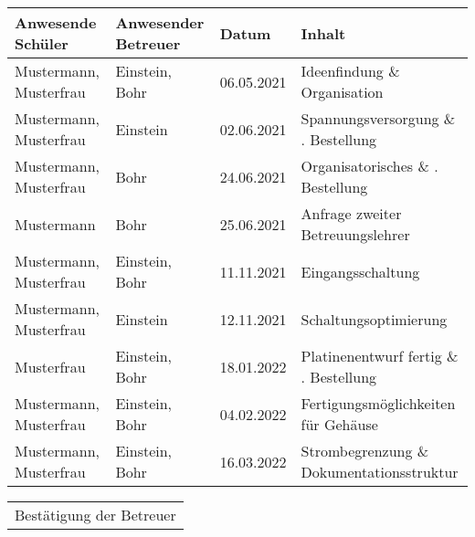 \begin{table}[H]
    \begin{tabularx}{\textwidth}{m{3cm}|m{3cm}|l|m{5.5cm}}
    \textbf{Anwesende Schüler} & \textbf{Anwesender Betreuer} & \textbf{Datum} & \textbf{Inhalt} \\ \hline \hline
    Mustermann, Musterfrau & Einstein, Bohr & 06.05.2021 & Ideenfindung \& Organisation \\    \hline       
    Mustermann, Musterfrau & Einstein  & 02.06.2021 & Spannungsversorgung \& \newline 1. Bestellung \\    \hline       
    Mustermann, Musterfrau &  Bohr  & 24.06.2021 & Organisatorisches \& \newline 2. Bestellung \\   \hline        
    Mustermann & Bohr  & 25.06.2021 & Anfrage zweiter \newline Betreuungslehrer \\    \hline       
    Mustermann, Musterfrau & Einstein, Bohr  & 11.11.2021 & Eingangsschaltung \\       \hline    
    Mustermann, Musterfrau & Einstein  & 12.11.2021 & Schaltungsoptimierung \\    \hline       
    Musterfrau & Einstein, Bohr  & 18.01.2022 & Platinenentwurf fertig \& \newline 4. Bestellung \\    \hline
    Mustermann, Musterfrau & Einstein, Bohr  & 04.02.2022 & Fertigungsmöglichkeiten \newline für Gehäuse \\  \hline
    Mustermann, Musterfrau & Einstein, Bohr  & 16.03.2022 & Strombegrenzung \& \newline Dokumentationsstruktur \\
    \end{tabularx}
\end{table}

\vfill
	\begin{table}[h!]
		\hfill
		\begin{tabular}{c}%
		\hline
		Bestätigung der Betreuer
		\end{tabular}
	\end{table}
	\vfill%